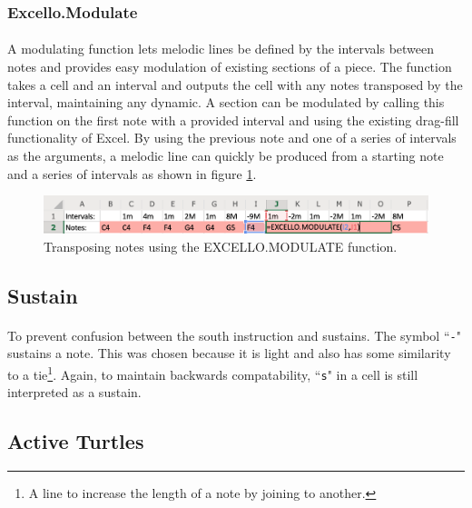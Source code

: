 \subsubsection{Excello.Modulate}

\paragraph{} A modulating function lets melodic lines be defined by the intervals between notes and provides easy modulation of existing sections of a piece. The function takes a cell and an interval and outputs the cell with any notes transposed by the interval, maintaining any dynamic. A section can be modulated by calling this function on the first note with a provided interval and using the existing drag-fill functionality of Excel. By using the previous note and one of a series of intervals as the arguments, a melodic line can quickly be produced from a starting note and a series of intervals as shown in figure \ref{implementation:modulateFunction}.

\begin{figure}[tbh]
\centerline{\includegraphics[width=150mm]{figs/modulateFunction.png}}
\caption{Transposing notes using the EXCELLO.MODULATE function.}
\label{implementation:modulateFunction}
\end{figure}


\subsection{Sustain}

\paragraph{} To prevent confusion between the south instruction and sustains. The symbol ``\texttt{-}" sustains a note. This was chosen because it is light and also has some similarity to a tie\footnote{A line to increase the length of a note by joining to another.}. Again, to maintain backwards compatability, ``\texttt{s}" in a cell is still interpreted as a sustain.

\subsection{Active Turtles}

